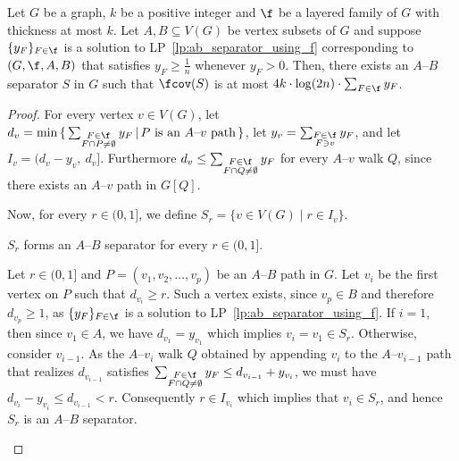 \begin{lemma}\label{lem:ab_separator_with_conditions}
    Let $G$ be a graph, $k$ be a positive integer and $\f$ be a layered family of $G$ with thickness at most $k$. Let $A,B \subseteq V(G)$ be vertex subsets of $G$ and suppose $\{y_F\}_{F \in \f}$ is a solution to LP~\ref{lp:ab_separator_using_f} corresponding to $(G,\f,A,B)$ that satisfies $y_F \ge \frac{1}{n}$ whenever $y_F > 0$. Then, there exists an $A$--$B$ separator $S$ in $G$ such that $\fcov(S)$ is at most $4k \cdot \log(2n) \cdot \sum_{F \in \f} y_F$.
\end{lemma}
\begin{proof}
    For every vertex $v \in V(G)$, let $d_v = \min\,\{\, \sum_{\substack{F \in \f \\ F \cap P \neq \emptyset}} y_F \,|\, P \text{ is an $A$--$v$ path} \,\}$, let $y_v = \sum_{\substack{F \in \f \\ F \ni v}} y_F$, and let $I_v = (d_v - y_v,\ d_v]$. 
    Furthermore $d_v \leq \sum_{\substack{F \in \f \\ F \cap Q \neq \emptyset}} y_F$ for every $A$--$v$ walk $Q$, since there exists an $A$--$v$ path in $G[Q]$. 

    Now, for every $r \in (0,1]$, we define $S_r = \{ v \in V(G) \mid r \in I_v \}$. 
    \begin{claim}\label{claim:S_r_is_A-B_sep}
        $S_r$ forms an $A$--$B$ separator for every $r\in (0,1]$.
    \end{claim}
    \begin{claimproof}
        Let $r\in (0,1]$ and $P = (v_1, v_2, \dots, v_p)$ be an $A$--$B$ path in $G$. Let $v_i$ be the first vertex on $P$ such that $d_{v_i} \geq r$. Such a vertex exists, since $v_p \in B$ and therefore $d_{v_p} \geq 1$, as $\{y_F\}_{F \in \f}$ is a solution to LP~\ref{lp:ab_separator_using_f}. If $i = 1$, then since $v_1 \in A$, we have $d_{v_1} = y_{v_1}$ which implies $v_i = v_1 \in S_r$. Otherwise, consider $v_{i-1}$. As the $A$--$v_i$ walk $Q$ obtained by appending $v_i$ to the $A$--$v_{i-1}$ path that realizes $d_{v_{i-1}}$ satisfies $\sum_{\substack{F \in \f \\ F \cap Q \neq \emptyset}} y_F \leq d_{v_{i-1}} + y_{v_i}$, we must have $d_{v_i} - y_{v_i} \leq d_{v_{i-1}} < r$. Consequently $r \in I_{v_i}$ which implies that $v_i \in S_r$, and hence $S_r$ is an $A$--$B$ separator.
    \end{claimproof}


\end{proof}
